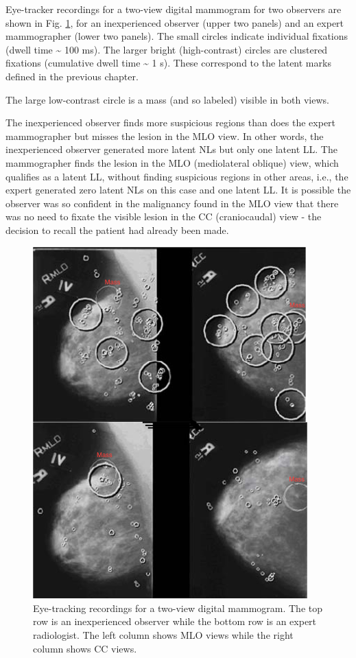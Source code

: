 \documentclass[
]{book}
\begin{document}
Eye-tracker recordings for a two-view digital mammogram for two observers are shown in Fig. \ref{fig:visual-search-eye-tracking}, for an inexperienced observer (upper two panels) and an expert mammographer (lower two panels). The small circles indicate individual fixations (dwell time \textasciitilde{} 100 ms). The larger bright (high-contrast) circles are clustered fixations (cumulative dwell time \textasciitilde{} 1 s). These correspond to the latent marks defined in the previous chapter.

The large low-contrast circle is a mass (and so labeled) visible in both views.

The inexperienced observer finds more suspicious regions than does the expert mammographer but misses the lesion in the MLO view. In other words, the inexperienced observer generated more latent NLs but only one latent LL. The mammographer finds the lesion in the MLO (mediolateral oblique) view, which qualifies as a latent LL, without finding suspicious regions in other areas, i.e., the expert generated zero latent NLs on this case and one latent LL. It is possible the observer was so confident in the malignancy found in the MLO view that there was no need to fixate the visible lesion in the CC (craniocaudal) view - the decision to recall the patient had already been made.

\begin{figure}

{\centering \includegraphics[width=300pt]{images/15-visual-search/eye-tracking-4-images} 

}

\caption{Eye-tracking recordings for a two-view digital mammogram. The top row is an inexperienced observer while the bottom row is an expert radiologist. The left column shows MLO views while the right column shows CC views.}\label{fig:visual-search-eye-tracking}
\end{figure}
\end{document}
